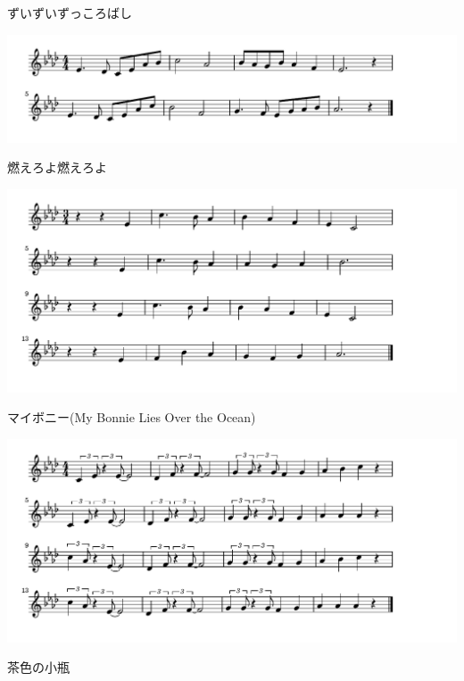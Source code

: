 \documentclass[a4paper]{ltjsarticle}
\begin{document}
\vspace{-10mm} \hspace{10mm}
ずいずいずっころばし

\includegraphics[clip]{moeroyo_crop.pdf}

\vspace{-10mm} \hspace{10mm}
燃えろよ燃えろよ

\includegraphics[clip]{mybonnie_crop.pdf}

\vspace{-10mm} \hspace{10mm}
マイボニー(My Bonnie Lies Over the Ocean)

\includegraphics[clip]{chairo_crop.pdf}

\vspace{-10mm} \hspace{10mm}
茶色の小瓶
\end{document}

